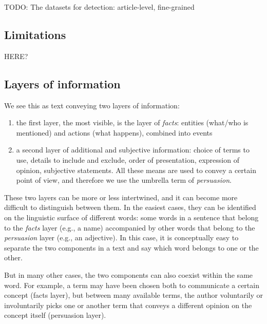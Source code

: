 TODO: The datasets for detection: article-level, fine-grained

\subsection{\statusred Limitations}
HERE?

\subsection{\statusgreen Layers of information}
\label{ssec:lit_layers_of_info}
We see this as text conveying two layers of information:
\begin{enumerate}
    \item the first layer, the most visible, is the layer of \emph{facts}: entities (what/who is mentioned) and actions (what happens), combined into events
    \item a second layer of additional and subjective information: choice of terms to use, details to include and exclude, order of presentation, expression of opinion, subjective statements. All these means are used to convey a certain point of view, and therefore we use the umbrella term of \emph{persuasion}.
\end{enumerate}



These two layers can be more or less intertwined, and it can become more difficult to distinguish between them.
In the easiest cases, they can be identified on the linguistic surface of different words: some words in a sentence that belong to the \emph{facts} layer (e.g., a name) accompanied by other words that belong to the \emph{persuasion} layer (e.g., an adjective).
In this case, it is conceptually easy to separate the two components in a text and say which word belongs to one or the other.

But in many other cases, the two components can also coexist within the same word. For example, a term may have been chosen both to communicate a certain concept (facts layer), but between many available terms, the author voluntarily or involuntarily picks one or another term that conveys a different opinion on the concept itself (persuasion layer).


